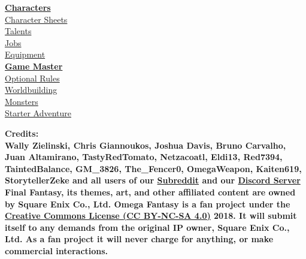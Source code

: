 \documentclass[a4paper,twocolumn, titlepage] {article}
\begin{document}
\begin{titlepage}
\begin{center}
	\vspace{0.5cm} \hyperlink{char}{\bf Characters}  \\
	\hspace{1cm} \hyperlink{cs}{Character Sheets}  \\ 
	\hspace{1cm} \hyperlink{talent}{Talents}  \\ 
	\hspace{1cm} \hyperlink{job}{Jobs}  \\ 
	\hspace{1cm} \hyperlink{equip}{Equipment}  \\ 
	\vspace{0.5cm} \hyperlink{gm}{\bf Game Master}  \\
	\hspace{1cm} \hyperlink{optrules}{Optional Rules}  \\ 
	\hspace{1cm} \hyperlink{world}{Worldbuilding}  \\ 
	\hspace{1cm} \hyperlink{monster}{Monsters}  \\ 
	\hspace{1cm} \hyperlink{coc}{Starter Adventure}  \\ 
	\end{center}
	\vfill
	\begin{center} 
	\footnotesize
	\textbf{
	Credits: \\
	Wally Zielinski, Chris Giannoukos, Joshua Davis, Bruno Carvalho, Juan Altamirano, TastyRedTomato, Netzacoatl, Eldi13,
	Red7394, TaintedBalance, GM\_3826, The\_Fencer0, OmegaWeapon, Kaiten619, StorytellerZeke and 
	all users of our \href{https://old.reddit.com/r/omegafantasy}{Subreddit} and our \href{https://discordapp.com/invite/F5fpxMs}{Discord Server} \vspace{0.3cm} \\
	Final Fantasy, its themes, art, and other affiliated content are owned by Square Enix Co., Ltd. 
	Omega Fantasy is a fan project under the \href{https://creativecommons.org/licenses/by-nc-sa/4.0/}{Creative Commons License (CC BY-NC-SA 4.0)} 2018. 
	It will submit itself to any demands from the original IP owner, Square Enix Co., Ltd. As a fan project it will never charge for anything, or make commercial interactions.
	}
	\end{center} 
\end{titlepage}

\restoregeometry
{}














\end{document}
